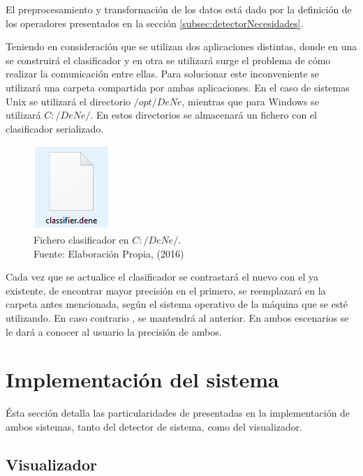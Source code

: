 El preprocesamiento y transformación de los datos está dado por la definición de los operadores presentados en la sección \ref{subsec:detectorNecesidades}.

Teniendo en consideración que se utilizan dos aplicaciones distintas, donde en una se construirá el clasificador y en otra se utilizará surge el problema de cómo realizar la comunicación entre ellas. Para solucionar este inconveniente se utilizará una carpeta compartida por ambas aplicaciones. En el caso de sistemas Unix se utilizará el directorio $/opt/DeNe$, mientras que para Windows se utilizará $C:/DeNe/$. En estos directorios se almacenará un fichero con el clasificador serializado.

\begin{figure}[H]
	\centering
	\captionsetup{justification=centering}
	\includegraphics[scale=0.8]{images/ClasifierDene.png}
	\caption[Fichero clasificador en $c:/DeNe/$.]{Fichero clasificador en $C:/DeNe/$.\\Fuente: Elaboración Propia, (2016)}
	\label{fig:TopologiaGeneral}
\end{figure}

Cada vez que se actualice el clasificador se contrastará el nuevo con el ya existente, de encontrar mayor precisión en el primero, se reemplazará en la carpeta antes mencionada, según el sistema operativo de la máquina que se esté utilizando. En caso contrario , se mantendrá al anterior. En ambos escenarios se le dará a conocer al usuario la precisión de ambos.

\section{Implementación del sistema}
\label{sec:implementacion}

Ésta sección detalla las particularidades de presentadas en la implementación de ambos sistemas, tanto del detector de sistema, como del visualizador.

\subsection{Visualizador}
\label{subsec:imp:visualizador}

